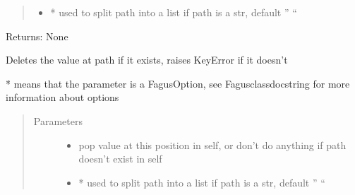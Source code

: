 \documentclass[a4paper,10pt,english]{sphinxmanual}
\begin{document}
\begin{fulllineitems}
\begin{fulllineitems}
\begin{quote}
\begin{description}
\begin{itemize}
\item {}
\sphinxAtStartPar
{} \textendash{} * used to split path into a list if path is a str, default ” “

\end{itemize}

\end{description}\end{quote}

\sphinxAtStartPar
Returns: None

\end{fulllineitems}


\begin{fulllineitems}
\label{\detokenize{fagus:fagus.Fagus.remove}}
\pysigstartsignatures
{}
\pysigstopsignatures
\sphinxAtStartPar
Deletes the value at path if it exists, raises KeyError if it doesn’t

\sphinxAtStartPar
* means that the parameter is a FagusOption, see Fagus\sphinxhyphen{}class\sphinxhyphen{}docstring for more information about options
\begin{quote}\begin{description}
\item[{Parameters}] \leavevmode\begin{itemize}
\item {}
\sphinxAtStartPar
{} \textendash{} pop value at this position in self, or don’t do anything if path doesn’t exist in self

\item {}
\sphinxAtStartPar
{} \textendash{} * used to split path into a list if path is a str, default ” “

\end{itemize}

\end{description}\end{quote}


\end{fulllineitems}
\end{fulllineitems}
\end{document}
